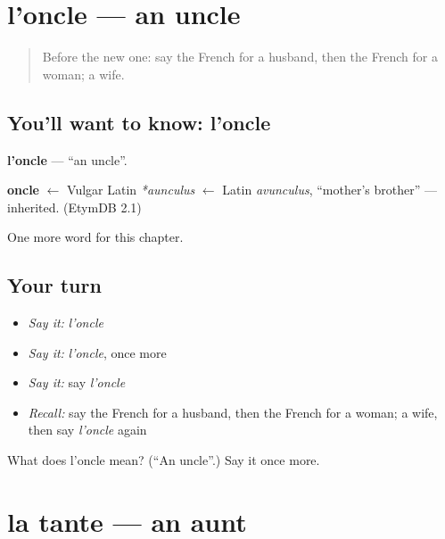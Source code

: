\section[l'oncle]{l'oncle — an uncle}

\label{lesson:FR-C57-oncle}



\begin{quote}
Before the new one: say the French for a husband, then the French for a woman; a wife.
\end{quote}

\subsection*{You'll want to know: l'oncle}
\textbf{l'oncle} — \textquotedblleft{}an uncle\textquotedblright{}.

\begin{cousinweb}
\textbf{oncle} $\leftarrow$ Vulgar Latin \emph{*aunculus} $\leftarrow$ Latin \emph{avunculus}, \textquotedblleft{}mother's brother\textquotedblright{} — inherited. (EtymDB 2.1)
\end{cousinweb}

\begin{grammarlens}[title={What you've built}]
One more word for this chapter.
\end{grammarlens}

\subsection*{Your turn}
\begin{itemize}
\raggedright
  \item \emph{Say it:} \emph{l'oncle}
  \item \emph{Say it:} \emph{l'oncle}, once more
  \item \emph{Say it:} say \emph{l'oncle}
  \item \emph{Recall:} say the French for a husband, then the French for a woman; a wife, then say \emph{l'oncle} again
\end{itemize}

\begin{tcolorbox}[breakable,colback=teal!4,colframe=teal!35!black,title={Before you move on}]
What does l'oncle mean? (\textquotedblleft{}An uncle\textquotedblright{}.) Say it once more.
\end{tcolorbox}
\section[la tante]{la tante — an aunt}

